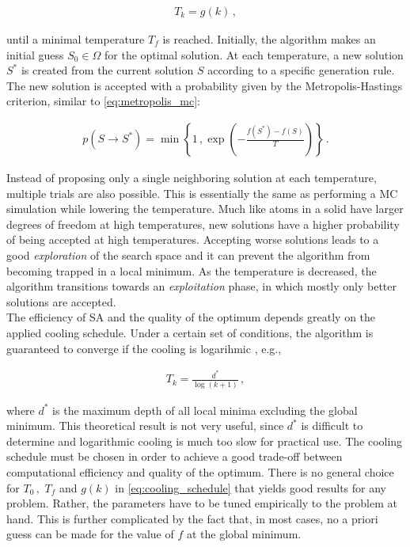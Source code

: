 \documentclass[bachelor,       %
               oneside,        %
               BCOR10mm,       %
               ngerman, english %
               ]{GAUBM}
\begin{document}
\begin{align}
    T_{k}=g(k)\,,
    \label{eq:cooling_schedule}
\end{align}

until a minimal temperature $T_f$ is reached. Initially, the algorithm makes an initial guess $S_0\in \Omega$ for the optimal solution. At each temperature, a new solution $S^*$ is created from the current solution $S$ according to a specific generation rule. The new solution is accepted with a probability given by the Metropolis-Hastings criterion, similar to \autoref{eq:metropolis_mc}:

\begin{align}
    p(S\rightarrow S^*)=\min\left\{1\,,\exp\left(-\frac{f(S^*)-f(S)}{T}\right)\right\}\,.
\end{align}

Instead of proposing only a single neighboring solution at each temperature, multiple trials are also possible. This is essentially the same as performing a \ac{MC} simulation while lowering the temperature. Much like atoms in a solid have larger degrees of freedom at high temperatures, new solutions have a higher probability of being accepted at high temperatures. Accepting worse solutions leads to a good \textit{exploration} of the search space and it can prevent the algorithm from becoming trapped in a local minimum. As the temperature is decreased, the algorithm transitions towards an \textit{exploitation} phase, in which mostly only better solutions are accepted.\\
The efficiency of \ac{SA} and the quality of the optimum depends greatly on the applied cooling schedule. Under a certain set of conditions, the algorithm is guaranteed to converge if the cooling is logarihmic \cite{hajek_sa}, e.g., 

\begin{align}
    T_k=\frac{d^*}{\log(k+1)}\,,
\end{align}

where $d^*$ is the maximum depth of all local minima excluding the global minimum. This theoretical result is not very useful, since $d^*$ is difficult to determine and logarithmic cooling is much too slow for practical use. The cooling schedule must be chosen in order to achieve a good trade-off between computational efficiency and quality of the optimum. There is no general choice for $T_0\,,$ $T_f$ and $g(k)$ in \autoref{eq:cooling_schedule} that yields good results for any problem. Rather, the parameters have to be tuned empirically to the problem at hand. This is further complicated by the fact that, in most cases, no a priori guess can be made for the value of $f$ at the global minimum.
\end{document}
